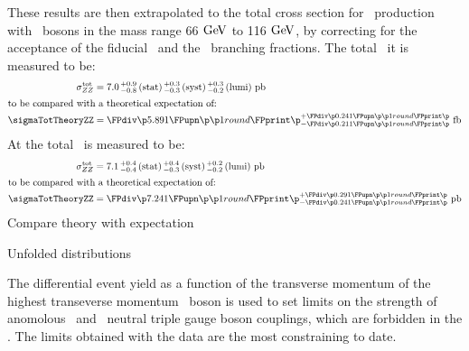 These results are then extrapolated to the total cross section for \ZZ\
production with \Z\ bosons in the mass range 66$\GeV$ to 116$\GeV$, by
correcting for the acceptance of the fiducial \phasespace\ and the \Zll\
branching fractions. The total \cx\ it  is measured to be:
\begin{align}
\sigmaTotZZ &= \ZZSevenTeVTotalCrossSection \\
\intertext{to be compared with a theoretical expectation of:}
\sigmaTotTheoryZZ &= \ZZSevenTeVTheoryTotalCrossSection
\end{align}
At \sqrtseq{8} the total \cx\ is measured to be:
\begin{align}
\sigmaTotZZ &= \ZZEightTeVTotalCrossSection \\
\intertext{to be compared with a theoretical expectation of:}
\sigmaTotTheoryZZ &= \ZZEightTeVTheoryTotalCrossSection
\end{align}
Compare theory with expectation

Unfolded distributions

The differential event yield as a function of the transverse momentum of the
highest transeverse momentum \Z\ boson is used to set limits on the strength of
anomolous \ZZZ\ and \ZZg\ neutral triple gauge boson couplings, which are
forbidden in the \sm. 
The limits obtained with the \sqrtseq{8} data are the most constraining to date.
